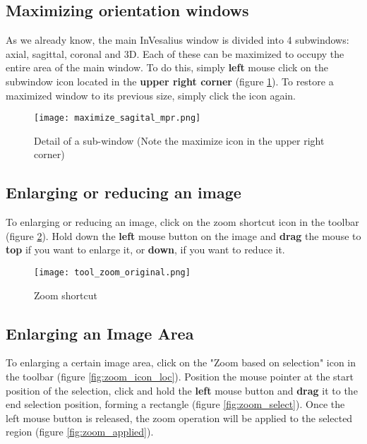 \subsection{Maximizing orientation windows}

As we already know, the main InVesalius window is divided into 4 subwindows: axial, sagittal, coronal and 3D. Each of these can be maximized to occupy the entire area of the main window. To do this, simply \textbf{left} mouse click on the subwindow icon located in the \textbf{upper right corner} (figure \ref{fig:maximize_window}). To restore a maximized window to its previous size, simply click the icon again.

\begin{figure}[!htb]
\centering
\texttt{[image: maximize\_sagital\_mpr.png]}
\caption{Detail of a sub-window (Note the maximize icon in the upper right corner)}
\label{fig:maximize_window}
\end{figure}

\subsection{Enlarging or reducing an image}

To enlarging or reducing an image, click on the zoom shortcut icon in the toolbar (figure \ref{fig:zoom_icon}). Hold down the \textbf{left} mouse button on the image and \textbf{drag} the mouse to \textbf{top} if you want to enlarge it, or \textbf{down}, if you want to reduce it.

\begin{figure}[!htb]
\centering
\texttt{[image: tool\_zoom\_original.png]}
\caption{Zoom shortcut}
\label{fig:zoom_icon}
\end{figure}


\subsection{Enlarging an Image Area}

To enlarging a certain image area, click on the "Zoom based on selection" icon in the toolbar (figure \ref{fig:zoom_icon_loc}). Position the mouse pointer at the start position of the selection, click and hold the \textbf{left} mouse button and \textbf{drag} it to the end selection position, forming a rectangle (figure \ref{fig:zoom_select}). Once the left mouse button is released, the zoom operation will be applied to the selected region (figure \ref{fig:zoom_applied}).

